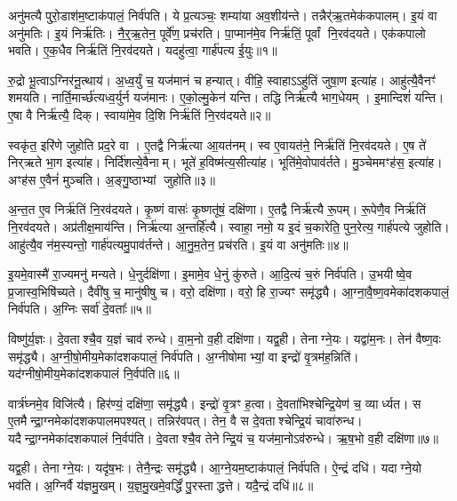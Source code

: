 अनु॑मत्यै पुरो॒डाश॑म॒ष्टाक॑पालं॒ निर्व॑पति।
ये प्र॒त्यञ्चः॒ शम्या॑या अव॒शीय॑न्ते।
तन्नैर्॑ऋ॒तमेक॑कपालम्।
इ॒यं वा अनु॑मतिः।
इ॒यं निर्\mbox{}ऋ॑तिः।
नै॒र्॒ऋ॒तेन॒ पूर्वे॑ण॒ प्रच॑रति।
पा॒प्मान॑मे॒व निर्\mbox{}ऋ॑तिं॒ पूर्वां नि॒रव॑दयते।
एक॑कपालो भवति।
ए॒क॒धैव निर्\mbox{}ऋ॑तिं नि॒रव॑दयते।
यदहु॑त्वा॒ गार्\mbox{}ह॑पत्य ई॒युः॥१॥

रु॒द्रो भू॒त्वा\-ऽग्निर॑नू॒त्थाय॑।
अ॒ध्व॒र्युं च॒ यज॑मानं च हन्यात्।
वीहि॒ स्वाहा\-ऽऽहु॑तिं जुषा॒ण इत्या॑ह।
आहु॑त्यै॒वैनꣳ॑ शमयति।
नार्ति॒मार्च्छ॑त्यध्व॒र्युर्न यज॑मानः।
ए॒को॒ल्मु॒केन॑ यन्ति।
तद्धि निर्\mbox{}ऋ॑त्यै भाग॒धेयम्।
इ॒मान्दिशं॑ यन्ति।
ए॒षा वै निर्\mbox{}ऋ॑त्यै॒ दिक्।
स्वाया॑मे॒व दि॒शि निर्\mbox{}ऋ॑तिं नि॒रव॑दयते॥२॥

स्वकृ॑त॒ इरि॑णे जुहोति प्रद॒रे वा।
ए॒तद्वै निर्\mbox{}ऋ॑त्या आ॒यत॑नम्।
स्व ए॒वायत॑ने॒ निर्\mbox{}ऋ॑तिं नि॒रव॑दयते।
ए॒ष ते॑ निर्‌\mbox{}ऋते भा॒ग इत्या॑ह।
निर्दि॑शत्ये॒वैनाम्।
भूते॑ ह॒विष्म॑त्य॒सीत्या॑ह।
भूति॑मे॒वोपाव॑र्तते।
मु॒ञ्चेममꣳह॑स॒ इत्या॑ह।
अꣳह॑स ए॒वैनं॑ मुञ्चति।
अ॒ङ्गु॒ष्ठाभ्यां जुहोति॥३॥

अ॒न्त॒त ए॒व निर्\mbox{}ऋ॑तिं नि॒रव॑दयते।
कृ॒ष्णं वासः॑ कृ॒ष्णतू॑षं॒ दक्षि॑णा।
ए॒तद्वै निर्\mbox{}ऋ॑त्यै रू॒पम्।
रू॒पेणै॒व निर्\mbox{}ऋ॑तिं नि॒रव॑दयते।
अप्र॑तीक्ष॒माय॑न्ति।
निर्\mbox{}ऋ॑त्या अ॒न्तर्\mbox{}हि॑त्यै।
स्वाहा॒ नमो॒ य इ॒दं च॒कारेति॒ पुन॒रेत्य॒ गार्\mbox{}ह॑पत्ये जुहोति।
आहु॑त्यै॒व न॑म॒स्यन्तो॒ गार्\mbox{}ह॑पत्यमु॒पाव॑र्तन्ते।
आ॒नु॒म॒तेन॒ प्रच॑रति।
इ॒यं वा अनु॑मतिः॥४॥

इ॒यमे॒वास्मै॑ रा॒ज्यमनु॑ मन्यते।
धे॒नुर्दक्षि॑णा।
इ॒मामे॒व धे॒नुं कु॑रुते।
आ॒दि॒त्यं च॒रुं निर्व॑पति।
उ॒भयीष्वे॒व प्र॒जास्व॒भिषि॑च्यते।
दैवी॑षु च॒ मानु॑षीषु च।
वरो॒ दक्षि॑णा।
वरो॒ हि रा॒ज्यꣳ समृ॑द्ध्यै।
आ॒ग्ना॒वै॒ष्ण॒वमेका॑दशकपालं॒ निर्व॑पति।
अ॒ग्निः सर्वा॑ दे॒वताः᳚॥५॥

विष्णु॑र्\mbox{}य॒ज्ञः।
दे॒वताश्चै॒व य॒ज्ञं चाव॑ रुन्धे।
वा॒म॒नो व॒ही दक्षि॑णा।
यद्व॒ही।
तेनाग्ने॒यः।
यद्वा॑म॒नः।
तेन॑ वैष्ण॒वः समृ॑द्ध्यै।
अ॒ग्नी॒षो॒मीय॒मेका॑दशकपालं॒ निर्व॑पति।
अ॒ग्नीषोमाभ्यां॒ वा इन्द्रो॑ वृ॒त्रम॑ह॒न्निति॑।
यद॑ग्नीषो॒मीय॒मेका॑दशकपालं नि॒र्वप॑ति॥६॥

वार्त्र॑घ्नमे॒व विजि॑त्यै।
हिर॑ण्यं॒ दक्षि॑णा॒ समृ॑द्ध्यै।
इन्द्रो॑ वृ॒त्रꣳ ह॒त्वा।
दे॒वता॑भिश्चेन्द्रि॒येण॑ च॒ व्यार्ध्यत।
स ए॒तमैन्द्रा॒ग्नमेका॑दशकपालमपश्यत्।
तन्निर॑वपत्।
तेन॒ वै स दे॒वताश्चेन्द्रि॒यं चावा॑रुन्ध।
यदैन्द्रा॒ग्नमेका॑दशकपालं नि॒र्वप॑ति।
दे॒वताश्चै॒व तेनेन्द्रि॒यं च॒ यज॑मा॒नो\-ऽव॑रुन्धे।
ऋ॒ष॒भो व॒ही दक्षि॑णा॥७॥

यद्व॒ही।
तेनाग्ने॒यः।
यदृ॑ष॒भः।
तेनै॒न्द्रः समृ॑द्ध्यै।
आ॒ग्ने॒यम॒ष्टाक॑पालं॒ निर्व॑पति।
ऐ॒न्द्रं दधि॑।
यदाग्ने॒यो भव॑ति।
अ॒ग्निर्वै य॑ज्ञमु॒खम्।
य॒ज्ञ॒मु॒खमे॒वर्द्धिं॑ पु॒रस्ताद्धत्ते।
यदै॒न्द्रं दधि॑॥८॥

